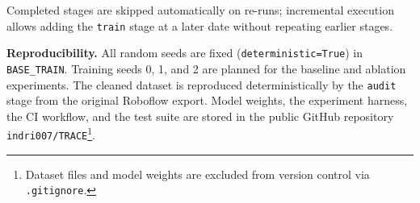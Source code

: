 Completed stages are skipped automatically on re-runs; incremental
execution allows adding the \texttt{train} stage at a later date without
repeating earlier stages.

\textbf{Reproducibility.}
All random seeds are fixed (\texttt{deterministic=True}) in
\texttt{BASE\_TRAIN}.
Training seeds 0, 1, and 2 are planned for the baseline and ablation
experiments.
The cleaned dataset is reproduced deterministically by the \texttt{audit}
stage from the original Roboflow export.
Model weights, the experiment harness, the CI workflow, and the test suite
are stored in the public GitHub repository
\texttt{indri007/TRACE}\footnote{Dataset files and model weights are
excluded from version control via \texttt{.gitignore}.}.
